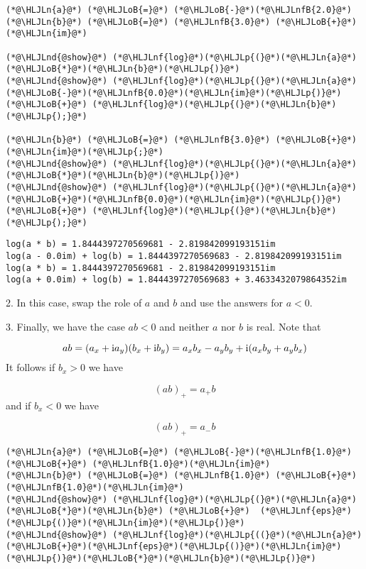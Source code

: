 \documentclass[12pt,landscape]{article}
\newcommand{\HLJLn}[1]{#1}
\newcommand{\HLJLnd}[1]{\textcolor[RGB]{214,102,97}{#1}}
\newcommand{\HLJLnf}[1]{\textcolor[RGB]{66,102,213}{#1}}
\newcommand{\HLJLnfB}[1]{\textcolor[RGB]{59,151,46}{#1}}
\newcommand{\HLJLoB}[1]{\textcolor[RGB]{102,102,102}{\textbf{#1}}}
\newcommand{\HLJLp}[1]{#1}
\def\I{ {\rm i} }
\begin{document}
{\begin{lstlisting}
(*@\HLJLn{a}@*) (*@\HLJLoB{=}@*) (*@\HLJLoB{-}@*)(*@\HLJLnfB{2.0}@*)
(*@\HLJLn{b}@*) (*@\HLJLoB{=}@*) (*@\HLJLnfB{3.0}@*) (*@\HLJLoB{+}@*) (*@\HLJLn{im}@*)

(*@\HLJLnd{@show}@*) (*@\HLJLnf{log}@*)(*@\HLJLp{(}@*)(*@\HLJLn{a}@*)(*@\HLJLoB{*}@*)(*@\HLJLn{b}@*)(*@\HLJLp{)}@*)
(*@\HLJLnd{@show}@*) (*@\HLJLnf{log}@*)(*@\HLJLp{(}@*)(*@\HLJLn{a}@*)(*@\HLJLoB{-}@*)(*@\HLJLnfB{0.0}@*)(*@\HLJLn{im}@*)(*@\HLJLp{)}@*) (*@\HLJLoB{+}@*) (*@\HLJLnf{log}@*)(*@\HLJLp{(}@*)(*@\HLJLn{b}@*)(*@\HLJLp{);}@*)

(*@\HLJLn{b}@*) (*@\HLJLoB{=}@*) (*@\HLJLnfB{3.0}@*) (*@\HLJLoB{+}@*) (*@\HLJLn{im}@*)(*@\HLJLp{;}@*)
(*@\HLJLnd{@show}@*) (*@\HLJLnf{log}@*)(*@\HLJLp{(}@*)(*@\HLJLn{a}@*)(*@\HLJLoB{*}@*)(*@\HLJLn{b}@*)(*@\HLJLp{)}@*)
(*@\HLJLnd{@show}@*) (*@\HLJLnf{log}@*)(*@\HLJLp{(}@*)(*@\HLJLn{a}@*)(*@\HLJLoB{+}@*)(*@\HLJLnfB{0.0}@*)(*@\HLJLn{im}@*)(*@\HLJLp{)}@*) (*@\HLJLoB{+}@*) (*@\HLJLnf{log}@*)(*@\HLJLp{(}@*)(*@\HLJLn{b}@*)(*@\HLJLp{);}@*)
\end{lstlisting}

\begin{lstlisting}
log(a * b) = 1.8444397270569681 - 2.819842099193151im
log(a - 0.0im) + log(b) = 1.8444397270569683 - 2.819842099193151im
log(a * b) = 1.8444397270569681 - 2.819842099193151im
log(a + 0.0im) + log(b) = 1.8444397270569683 + 3.4633432079864352im
\end{lstlisting}


2. In this case, swap the role of $a$ and $b$ and use the answers for $a < 0$.

3. Finally, we have the case $a b < 0$ and neither $a$ nor $b$ is real. Note that

\[
ab = (a_x + \I a_y) (b_x + \I b_y) = a_x b_x - a_y b_y +  \I(a_x b_y + a_yb_x)
\]
It follows if $b_x > 0$ we have

\[
(ab)_+ = a_+ b
\]
and if $b_x < 0$ we have

\[
(ab)_+ = a_- b
\]

\begin{lstlisting}
(*@\HLJLn{a}@*) (*@\HLJLoB{=}@*) (*@\HLJLoB{-}@*)(*@\HLJLnfB{1.0}@*) (*@\HLJLoB{+}@*) (*@\HLJLnfB{1.0}@*)(*@\HLJLn{im}@*)
(*@\HLJLn{b}@*) (*@\HLJLoB{=}@*) (*@\HLJLnfB{1.0}@*) (*@\HLJLoB{+}@*) (*@\HLJLnfB{1.0}@*)(*@\HLJLn{im}@*)
(*@\HLJLnd{@show}@*) (*@\HLJLnf{log}@*)(*@\HLJLp{(}@*)(*@\HLJLn{a}@*)(*@\HLJLoB{*}@*)(*@\HLJLn{b}@*) (*@\HLJLoB{+}@*)  (*@\HLJLnf{eps}@*)(*@\HLJLp{()}@*)(*@\HLJLn{im}@*)(*@\HLJLp{)}@*)
(*@\HLJLnd{@show}@*) (*@\HLJLnf{log}@*)(*@\HLJLp{((}@*)(*@\HLJLn{a}@*)(*@\HLJLoB{+}@*)(*@\HLJLnf{eps}@*)(*@\HLJLp{()}@*)(*@\HLJLn{im}@*)(*@\HLJLp{)}@*)(*@\HLJLoB{*}@*)(*@\HLJLn{b}@*)(*@\HLJLp{)}@*)


\end{lstlisting}}
\end{document}
